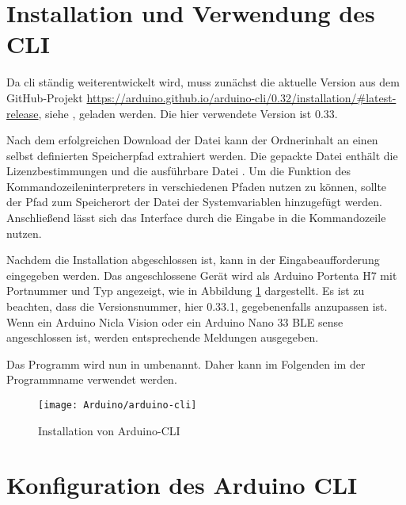 \section{Installation und Verwendung des CLI}

Da \ac{cli} ständig weiterentwickelt wird, muss zunächst die aktuelle Version aus dem GitHub-Projekt \url{https://arduino.github.io/arduino-cli/0.32/installation/#latest-release}, siehe \cite{ArduinoCLIGit:2022},  geladen werden. Die hier verwendete Version ist 0.33. \cite{ArduinoCLI:2018}

\bigskip

Nach dem erfolgreichen Download der Datei  kann der Ordnerinhalt an einen selbst definierten  Speicherpfad extrahiert werden. Die gepackte Datei enthält die Lizenzbestimmungen und die ausführbare Datei . Um die Funktion des Kommandozeileninterpreters in verschiedenen Pfaden nutzen zu können, sollte der Pfad zum Speicherort der Datei   der Systemvariablen  hinzugefügt werden. Anschließend lässt sich das Interface durch die Eingabe  in die Kommandozeile nutzen.



Nachdem die Installation abgeschlossen ist, kann  in der Eingabeaufforderung eingegeben werden. Das angeschlossene Gerät wird als Arduino Portenta H7 mit Portnummer und Typ angezeigt, wie in Abbildung \ref{ArduinoInstallation} dargestellt. Es ist zu beachten, dass die Versionsnummer, hier 0.33.1, gegebenenfalls anzupassen ist. Wenn ein Arduino Nicla Vision oder ein Arduino Nano 33 BLE sense   angeschlossen ist, werden entsprechende Meldungen ausgegeben.

Das Programm  wird nun in  umbenannt. Daher kann im Folgenden im der Programmname  verwendet werden.
    
    
    \begin{figure}
        \centering
        \texttt{[image: Arduino/arduino-cli]}
        \caption{Installation von Arduino-CLI  }
        \label{ArduinoInstallation}
    \end{figure}


\section{Konfiguration des Arduino CLI}


